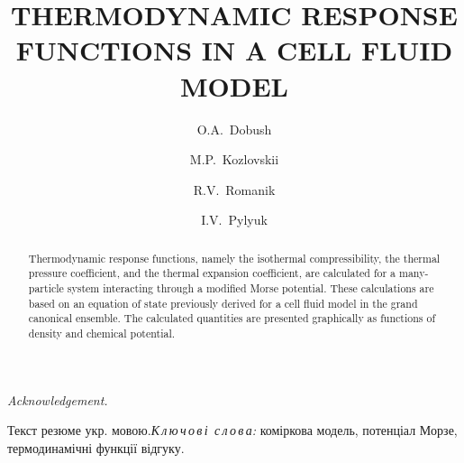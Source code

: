 \documentclass[fleqn,twoside,twocolumn,nofootinbib,showkeys]{revtex4} %
\begin{document}
	\title[Thermodynamic response functions in a cell fluid model]%
	{THERMODYNAMIC RESPONSE FUNCTIONS IN A CELL FLUID MODEL}%
	\author{O.A.~Dobush}%
	\author{M.P.~Kozlovskii}
	\author{R.V.~Romanik}
	\author{I.V.~Pylyuk}
	\address{1, Svientsitskii Str., Lviv 79011, Ukraine}%
	
	 \razd{\secv}
	
	
	\setcounter{page}{1}%
	
	\begin{abstract}
		Thermodynamic response functions, namely the isothermal compressibility, the thermal pressure coefficient, and the thermal expansion coefficient, are calculated for a many-particle system interacting through a modified Morse potential. These calculations are based on an equation of state previously derived for a cell fluid model in the grand canonical ensemble. The calculated quantities are presented graphically as functions of density and chemical potential.
	\end{abstract}
	
	
	\maketitle
	
	
	
	\vskip3mm \textit{Acknowledgement.}
	
	
		
	\vspace*{-5mm} {Текст резюме укр. мовою.}{\textit{К\,л\,ю\,ч\,о\,в\,і\,
			с\,л\,о\,в\,а:} коміркова модель, потенціал Морзе, термодинамічні функції відгуку.}
	
\end{document}
